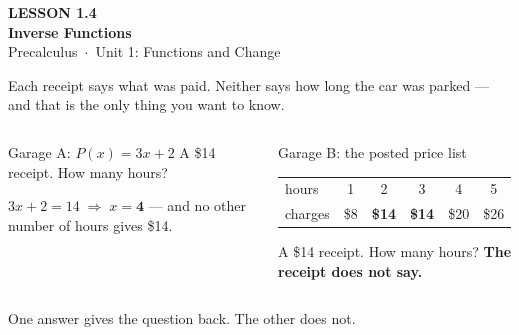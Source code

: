 \documentclass[aspectratio=169, 11pt]{beamer}
\begin{document}
{
\begin{frame}[plain]
  \vspace{2.8cm}\hspace{0.55cm}%
  \begin{minipage}{0.9\textwidth}
    {\color{goldacc}\bfseries\small LESSON 1.4}\\[0.5cm]
    {\color{white}\bfseries\LARGE Inverse Functions}\\[1.2cm]
    {\color{lilacmid}\small Precalculus~$\cdot$~Unit 1: Functions and Change}
  \end{minipage}
\end{frame}
}

\begin{frame}[t, plain]

  Each receipt says what was paid. Neither says how long the car was parked ---
  and that is the only thing you want to know.

  \smallskip
  \begin{columns}[T, onlytextwidth]
      \begin{block}{Garage A: \(P(x) = 3x + 2\)}
        A \$14 receipt. How many hours?

        \smallskip
        \(3x + 2 = 14 \;\Rightarrow\; x = \mathbf{4}\) --- and no other number
        of hours gives \$14.
      \end{block}

      \begin{block}{Garage B: the posted price list}
        \renewcommand{\arraystretch}{1.2}
        \begin{tabular}{@{}lccccc@{}}
          hours   & 1 & 2 & 3 & 4 & 5 \\
          charges & \$8 & \textbf{\$14} & \textbf{\$14} & \$20 & \$26 \\
        \end{tabular}

        \smallskip
        A \$14 receipt. How many hours? \textbf{The receipt does not say.}
      \end{block}
  \end{columns}

  \medskip
  \begin{center}
    One answer gives the question back. The other does not.
  \end{center}
\end{frame}
\end{document}
